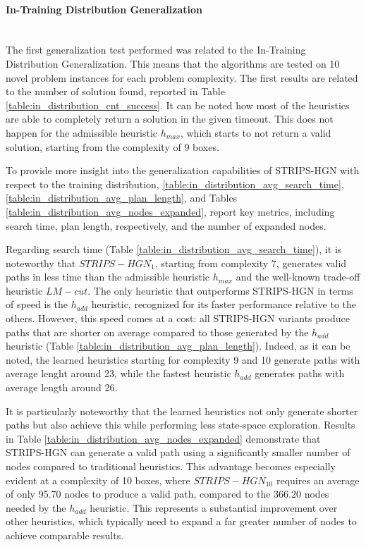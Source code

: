 \paragraph*{In-Training Distribution Generalization}\mbox{}\\
The first generalization test performed was related to the In-Training Distribution Generalization. This means that the algorithms are tested on 10 novel problem instances for each problem complexity.
The first results are related to the number of solution found, reported in Table \ref{table:in_distribution_cnt_success}. It can be noted how most of the heuristics are able to completely return a solution in the given timeout. This does not happen for the admissible heuristic $h_{max}$, which starts to not return a valid solution, starting from the complexity of 9 boxes. 



To provide more insight into the generalization capabilities of STRIPS-HGN with respect to the training distribution, \ref{table:in_distribution_avg_search_time}, \ref{table:in_distribution_avg_plan_length}, and Tables \ref{table:in_distribution_avg_nodes_expanded}, report key metrics, including search time, plan length, respectively, and the number of expanded nodes.



Regarding search time (Table \ref{table:in_distribution_avg_search_time}), it is noteworthy that $STRIPS-HGN_1$, starting from complexity 7, generates valid paths in less time than the admissible heuristic $h_{max}$ and the well-known trade-off heuristic $LM-cut$. The only heuristic that outperforms STRIPS-HGN in terms of speed is the $h_{add}$ heuristic, recognized for its faster performance relative to the others. However, this speed comes at a cost: all STRIPS-HGN variants produce paths that are shorter on average compared to those generated by the $h_{add}$ heuristic (Table \ref{table:in_distribution_avg_plan_length}). Indeed, as it can be noted, the learned heuristics starting for complexity 9 and 10 generate paths with average lenght around 23, while the fastest heuristic $h_{add}$ generates paths with average length around 26.

It is particularly noteworthy that the learned heuristics not only generate shorter paths but also achieve this while performing less state-space exploration. Results in Table \ref{table:in_distribution_avg_nodes_expanded} demonstrate that STRIPS-HGN can generate a valid path using a significantly smaller number of nodes compared to traditional heuristics. This advantage becomes especially evident at a complexity of 10 boxes, where $STRIPS-HGN_{10}$ requires an average of only 95.70 nodes to produce a valid path, compared to the 366.20 nodes needed by the $h_{add}$ heuristic. This represents a substantial improvement over other heuristics, which typically need to expand a far greater number of nodes to achieve comparable results. 

